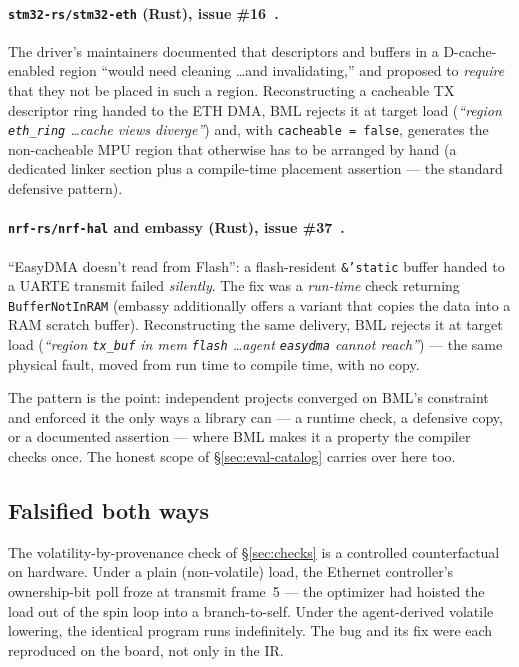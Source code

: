 \documentclass[10pt,twocolumn]{article}
\begin{document}
\paragraph{\texttt{stm32-rs/stm32-eth} (Rust), issue \#16~\cite{stm32eth}.} The
driver's maintainers documented that descriptors and buffers in a
D-cache-enabled region ``would need cleaning \ldots and invalidating,'' and
proposed to \emph{require} that they not be placed in such a region.
Reconstructing a cacheable TX descriptor ring handed to the ETH DMA, BML rejects
it at target load (\emph{``region \texttt{eth\_ring} \ldots cache views
diverge''}) and, with \texttt{cacheable = false}, generates the non-cacheable
MPU region that otherwise has to be arranged by hand (a dedicated linker section
plus a compile-time placement assertion --- the standard defensive pattern).

\paragraph{\texttt{nrf-rs/nrf-hal} and embassy (Rust), issue \#37~\cite{nrfhal}.}
``EasyDMA doesn't read from Flash'': a flash-resident \texttt{\&'static} buffer
handed to a UARTE transmit failed \emph{silently}. The fix was a \emph{run-time}
check returning \texttt{BufferNotInRAM} (embassy additionally offers a variant
that copies the data into a RAM scratch buffer). Reconstructing the same
delivery, BML rejects it at target load (\emph{``region \texttt{tx\_buf} in mem
\texttt{flash} \ldots agent \texttt{easydma} cannot reach''}) --- the same
physical fault, moved from run time to compile time, with no copy.

The pattern is the point: independent projects converged on BML's constraint and
enforced it the only ways a library can --- a runtime check, a defensive copy, or
a documented assertion --- where BML makes it a property the compiler checks once.
The honest scope of \S\ref{sec:eval-catalog} carries over here too.

\subsection{Falsified both ways}
\label{sec:eval-counterfactual}

The volatility-by-provenance check of \S\ref{sec:checks} is a controlled
counterfactual on hardware. Under a plain (non-volatile) load, the Ethernet
controller's ownership-bit poll froze at transmit frame~5 --- the optimizer had
hoisted the load out of the spin loop into a branch-to-self. Under the
agent-derived volatile lowering, the identical program runs indefinitely. The bug
and its fix were each reproduced on the board, not only in the IR.
\end{document}
